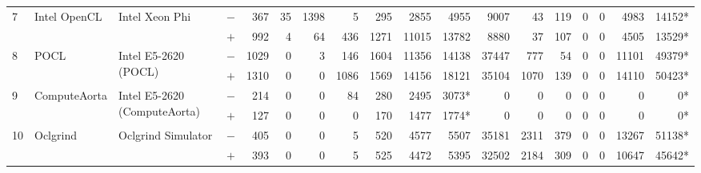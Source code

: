 \begin{tabular}{llll | rrrrrrr | rrrrrrr }
\hline
\multirow{ 2}{*}{7} & \multirow{ 2}{*}{Intel OpenCL} & \multirow{ 2}{*}{Intel Xeon Phi} & $-$ & 367 & 35 & 1398 & 5 & 295 & 2855 & 4955       & 9007 & 43 & 119 & 0 & 0 & 4983 & 14152* \\& & & $+$ & 992 & 4 & 64 & 436 & 1271 & 11015 & 13782 & 8880 & 37 & 107 & 0 & 0 & 4505 & 13529* \\
\hline
\multirow{ 2}{*}{8} & \multirow{ 2}{*}{POCL} & \multirow{ 2}{*}{Intel E5-2620 (POCL)} & $-$ & 1029 & 0 & 3 & 146 & 1604 & 11356 & 14138       & 37447 & 777 & 54 & 0 & 0 & 11101 & 49379* \\& & & $+$ & 1310 & 0 & 0 & 1086 & 1569 & 14156 & 18121 & 35104 & 1070 & 139 & 0 & 0 & 14110 & 50423* \\
\hline
\multirow{ 2}{*}{9} & \multirow{ 2}{*}{ComputeAorta} & \multirow{ 2}{*}{Intel E5-2620 (ComputeAorta)} & $-$ & 214 & 0 & 0 & 84 & 280 & 2495 & 3073*       & 0 & 0 & 0 & 0 & 0 & 0 & 0* \\& & & $+$ & 127 & 0 & 0 & 0 & 170 & 1477 & 1774* & 0 & 0 & 0 & 0 & 0 & 0 & 0* \\
\hline
\multirow{ 2}{*}{10} & \multirow{ 2}{*}{Oclgrind} & \multirow{ 2}{*}{Oclgrind Simulator} & $-$ & 405 & 0 & 0 & 5 & 520 & 4577 & 5507       & 35181 & 2311 & 379 & 0 & 0 & 13267 & 51138* \\& & & $+$ & 393 & 0 & 0 & 5 & 525 & 4472 & 5395 & 32502 & 2184 & 309 & 0 & 0 & 10647 & 45642* \\
  \bottomrule
\end{tabular}

